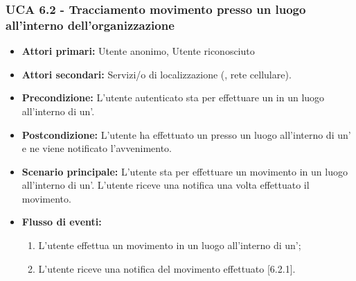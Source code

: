\subsubsection{UCA 6.2 - Tracciamento movimento presso un luogo all'interno dell'organizzazione}
\begin{itemize}
	\item \textbf{Attori primari:} Utente anonimo, Utente riconosciuto
	\item \textbf{Attori secondari:} Servizi/o di localizzazione (, rete cellulare).
	\item \textbf{Precondizione:} L'utente autenticato sta per effettuare un  in un luogo all'interno di un'.
	\item \textbf{Postcondizione:} L'utente ha effettuato un  presso un luogo all'interno di un' e ne viene notificato l'avvenimento.
	\item \textbf{Scenario principale:} L'utente sta per effettuare un movimento in un luogo all'interno di un'. L'utente riceve una notifica una volta effettuato il movimento.
	\item \textbf{Flusso di eventi:}
	\begin{enumerate}
		\item L'utente effettua un movimento in un luogo all'interno di un';
		\item L'utente riceve una notifica del movimento effettuato [6.2.1].
	\end{enumerate}
\end{itemize}

